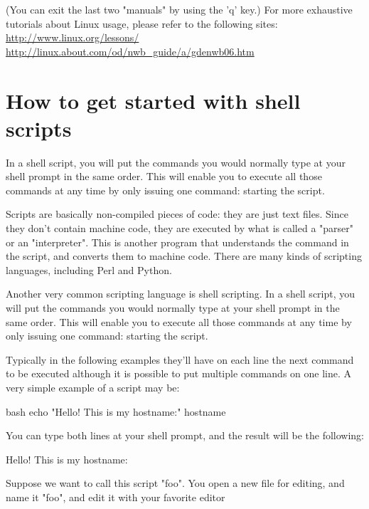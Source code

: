\begin{prompt}
\end{prompt}

(You can exit the last two "manuals" by using the 'q' key.)
For more exhaustive tutorials about Linux usage, please refer to the following sites:
\url{http://www.linux.org/lessons/}
\url{http://linux.about.com/od/nwb\_guide/a/gdenwb06.htm}

\section{How to get started with shell scripts}

In a shell script, you will put the commands you would normally type at your
shell prompt in the same order. This will enable you to execute all those
commands at any time by only issuing one command: starting the script.

Scripts are basically non-compiled pieces of code: they are just text files.
Since they don't contain machine code, they are executed by what is called a
"parser" or an "interpreter". This is another program that understands the
command in the script, and converts them to machine code. There are many kinds
of scripting languages, including Perl and Python.

Another very common scripting language is shell scripting. In a shell script,
you will put the commands you would normally type at your shell prompt in the
same order. This will enable you to execute all those commands at any time by
only issuing one command: starting the script.

Typically in the following examples they'll have on each line the next command
to be executed although it is possible to put multiple commands on one line. A
very simple example of a script may be:

\begin{code}{bash}
echo "Hello! This is my hostname:"
hostname
\end{code}

You can type both lines at your shell prompt, and the result will be the following:
\begin{prompt}
Hello! This is my hostname:
\end{prompt}

Suppose we want to call this script "foo". You open a new file for editing, and
name it "foo", and edit it with your favorite editor


